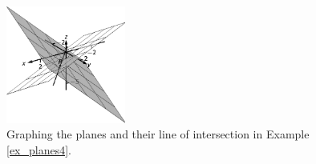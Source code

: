 \begin{example}
\begin{figure}[H]
	\begin{center}
			\includegraphics[width=0.35\textwidth]{fig_ana_geo_7}
	\caption{Graphing the planes and their line of intersection in Example \ref{ex_planes4}.}
	\label{fig_ana_geo_7}
	\end{center}
\end{figure}

\end{example}

